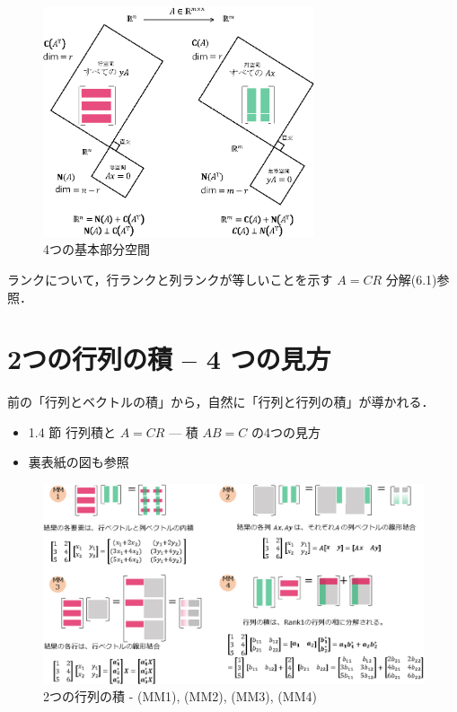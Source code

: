 \documentclass[letterpaper]{article}
\begin{document}
\begin{figure}[H]
  \centering
  \includegraphics[keepaspectratio, width=8cm]{4-Subspaces-j.eps}
  \caption{4つの基本部分空間}
\end{figure}

ランクについて，行ランクと列ランクが等しいことを示す $A=CR$ 分解(6.1)参照．
\clearpage

\section{2つの行列の積 -- 4 つの見方}

前の「行列とベクトルの積」から，自然に「行列と行列の積」が導かれる．

\begin{itemize}
  \item 1.4 節 行列積と $A=CR$ \; --- 積 $AB=C$ の4つの見方
  \item 裏表紙の図も参照
\end{itemize} 


\begin{figure}[H]
  \includegraphics[keepaspectratio, width=\linewidth]{MatrixTimesMatrix-j.eps}
  \caption{2つの行列の積 - (MM1), (MM2), (MM3), (MM4)}
\end{figure}
\end{document}
